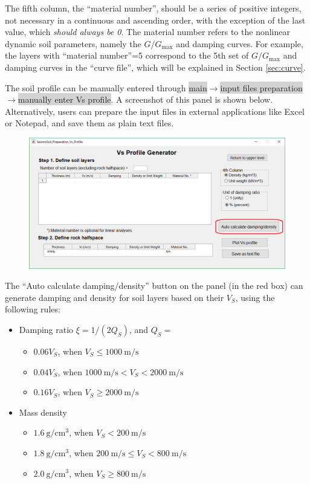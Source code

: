 \documentclass[11pt,letterpaper]{article}
\newcommand{\panel}[1]{\colorbox{lightgray}{\textsf{#1}}}
\newcommand{\ein}[1]{~\mathrm{#1}}  %
\begin{document}
The fifth column, the ``material number'', should be a series of positive integers, not necessary in a continuous and ascending order, with the exception of the last value, which \emph{should always be 0}. The material number refers to the nonlinear dynamic soil parameters, namely the $G/G_{\max}$ and damping curves. For example, the layers with ``material number''=5 correspond to the 5th set of $G/G_{\max}$ and damping curves in the ``curve file'', which will be explained in Section \ref{sec:curve}.

The soil profile can be manually entered through \panel{main}$\rightarrow$\panel{input files preparation}$\rightarrow$\panel{manually enter Vs profile}. A screenshot of this panel is shown below.  Alternatively, users can prepare the input files in external applications like Excel or Notepad, and save them as plain text files.

\begin{figure}[H]
\centering
  \includegraphics[width=\textwidth]{profile_prepare.png}\\
\end{figure}

The ``Auto calculate damping/density'' button on the panel (in the red box) can generate damping and density for soil layers based on their $V_S$, using the following rules:

\begin{itemize}
    \item Damping ratio $\xi=1/(2Q_S)$, and $Q_S=$
    \begin{itemize}
        \item $0.06V_S$, when $V_S\leqslant1000\ein{m/s}$
        \item $0.04V_S$, when $1000\ein{m/s}< V_S<2000\ein{m/s}$
        \item $0.16V_S$, when $V_S\geqslant 2000\ein{m/s}$
    \end{itemize}
    \item Mass density
    \begin{itemize}
        \item $1.6\ein{g/cm^3}$, when $V_S<200\ein{m/s}$
        \item $1.8\ein{g/cm^3}$, when $200\ein{m/s}\leqslant V_S<800\ein{m/s}$
        \item $2.0\ein{g/cm^3}$, when $V_S\geqslant 800\ein{m/s}$
    \end{itemize}
\end{itemize}
\end{document}
